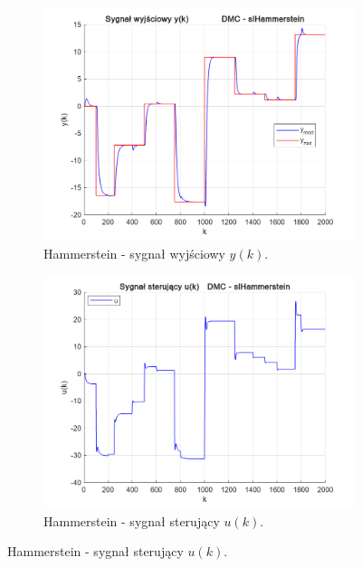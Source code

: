 \begin{figure}[b!]
\centering
\begin{subfigure}[b]{0.49\paperwidth}
\centering
\includegraphics[width=\linewidth]{pictures/y_slHammerstein}
\caption{Hammerstein - sygnał wyjściowy $y(k)$.}
\end{subfigure}
\hfill
\begin{subfigure}[b]{0.49\paperwidth}
\centering
\includegraphics[width=\linewidth]{pictures/u_slHammerstein}
\caption{Hammerstein -  sygnał sterujący $u(k)$.}
\end{subfigure}
    
\vspace{0.5cm} %


\end{figure}
